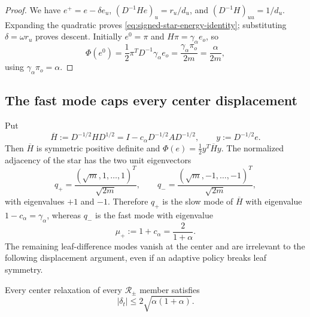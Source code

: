 \begin{proof}
We have $e^+=e-\delta e_u$,
$(D^{-1}He)_u=r_u/d_u$, and
$(D^{-1}H)_{uu}=1/d_u$.  Expanding the quadratic proves
\eqref{eq:signed-star-energy-identity}; substituting
$\delta=\omega r_u$ proves descent.  Initially $e^0=\pi$ and
$H\pi=\gamma_\alpha e_o$, so
\[
  \Phi(e^0)
  =\frac12\pi^TD^{-1}\gamma_\alpha e_o
  =\frac{\gamma_\alpha\pi_o}{2m}
  =\frac{\alpha}{2m},
\]
using $\gamma_\alpha\pi_o=\alpha$.
\end{proof}

\subsection{The fast mode caps every center displacement}

Put
\begin{equation}
  \overline H:=D^{-1/2}HD^{1/2}
  =I-c_\alpha D^{-1/2}AD^{-1/2},
  \qquad y:=D^{-1/2}e.
  \label{eq:signed-star-symmetric-operator}
\end{equation}
Then $\overline H$ is symmetric positive definite and
$\Phi(e)=\tfrac12y^T\overline Hy$.  The normalized adjacency of the star has
the two unit eigenvectors
\begin{equation}
  q_+=\frac{(\sqrt m,1,\ldots,1)^T}{\sqrt{2m}},
  \qquad
  q_-=\frac{(\sqrt m,-1,\ldots,-1)^T}{\sqrt{2m}},
  \label{eq:signed-star-two-modes}
\end{equation}
with eigenvalues $+1$ and $-1$.  Therefore $q_+$ is the slow mode of
$\overline H$ with eigenvalue $1-c_\alpha=\gamma_\alpha$, whereas $q_-$ is
the fast mode with eigenvalue
\begin{equation}
  \mu_+:=1+c_\alpha=\frac{2}{1+\alpha}.
  \label{eq:signed-star-fast-eigenvalue}
\end{equation}
The remaining leaf-difference modes vanish at the center and are irrelevant
to the following displacement argument, even if an adaptive policy breaks
leaf symmetry.

\begin{lemma}
\label{lem:signed-star-displacement-cap}
Every center relaxation of every $\mathcal R_{\pm}$ member satisfies
\begin{equation}
  |\delta_t|\le2\sqrt{\alpha(1+\alpha)}.
  \label{eq:signed-star-displacement-cap}
\end{equation}
\end{lemma}

